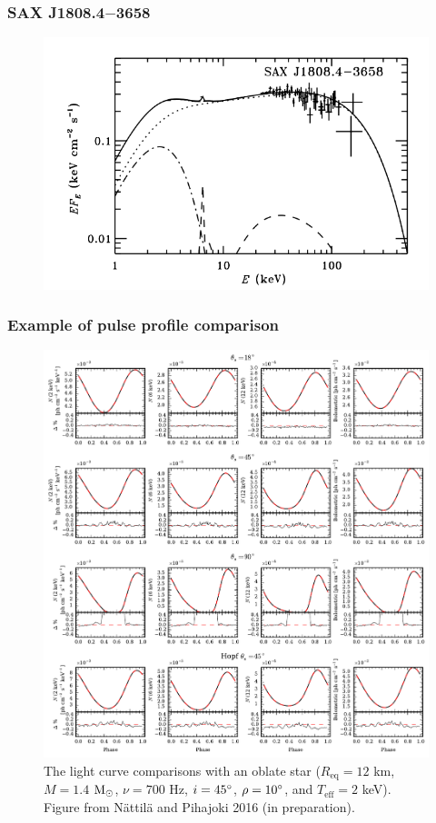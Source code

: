 \documentclass{beamer}
\def\msun{{\rm M_{\odot}}}
\begin{document}

\begin{frame}
\frametitle{SAX J1808.4$-$3658}

\begin{figure}
\includegraphics[width=0.8\linewidth]{spectrum_sax.png}
\end{figure}

\end{frame}








\begin{frame}
\frametitle{Example of pulse profile comparison}

\begin{figure}
\includegraphics[width=0.5\linewidth]{jpulsec3.pdf}
\caption{The light curve comparisons with an oblate star ($R_{\mathrm{eq}} = 12$ km, $M = 1.4$ $\msun$, $\nu = 700$ Hz, $i = 45 \degree$, $\rho = 10 \degree$, and $T_{\mathrm{eff}} = 2$ keV). Figure from Nättilä and Pihajoki 2016 (in preparation).}
\end{figure}

\end{frame}
\end{document}
